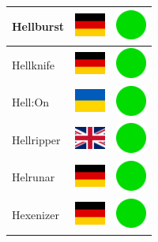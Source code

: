 \documentclass[12pt, a4paper, twoside]{report}
\begin{document}
\begin{center}
\begin{longtable}{|p{5cm}|p{2cm}|p{2cm}|}
			Hellburst & \includegraphics[width=1cm]{4x3/de} & \includegraphics[width=1cm]{likes/y} \\ \hline
			Hellknife & \includegraphics[width=1cm]{4x3/de} & \includegraphics[width=1cm]{likes/y} \\ \hline
			Hell:On & \includegraphics[width=1cm]{4x3/ua} & \includegraphics[width=1cm]{likes/y} \\ \hline
			Hellripper & \includegraphics[width=1cm]{4x3/gb} & \includegraphics[width=1cm]{likes/y} \\ \hline
			Helrunar & \includegraphics[width=1cm]{4x3/de} & \includegraphics[width=1cm]{likes/y} \\ \hline
			Hexenizer & \includegraphics[width=1cm]{4x3/de} & \includegraphics[width=1cm]{likes/y} \\ \hline

\end{longtable}
\end{center}
\end{document}
